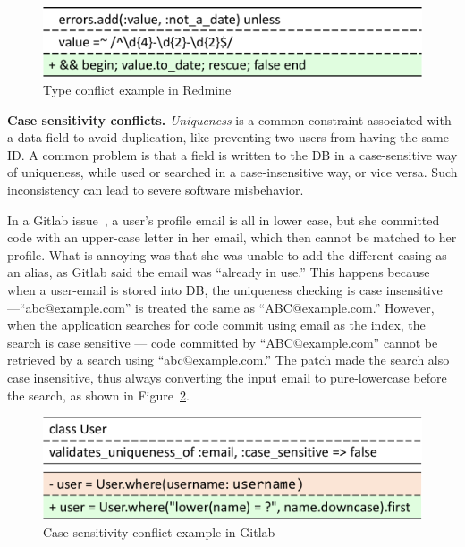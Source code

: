 \begin{figure}
    \centering
    \includegraphics[width=0.6\columnwidth]{constraints/figs/redmine-9394-tooloose.pdf}
    \vspace{-0.2in}
    \caption{Type conflict example in Redmine}
    \label{fig:redmine-9394-tooloose}
\end{figure}

\textbf{Case sensitivity conflicts.} 
{\it Uniqueness} is a common constraint associated with a data field to
avoid duplication, like preventing two users from having the same ID. 
A common problem is that a field is written to the DB in
a case-sensitive way of uniqueness, while used or searched in a
case-insensitive way, or vice versa. Such inconsistency can lead to severe software misbehavior. 

In a Gitlab issue~\cite{gitlab-24493}, a user's profile email is all in lower case, but she committed code with an upper-case letter in her email, which then cannot
be matched to her profile. What is annoying was that she was 
unable to add the different casing as an alias, as Gitlab said
the email was ``already in use.''  This happens because when a user-email is stored into DB, the uniqueness checking
is case insensitive---``abc@example.com'' is treated the same as ``ABC@example.com.'' However, when the application searches for code commit using email
as the index, the search is case sensitive --- code committed by
``ABC@example.com'' cannot be retrieved by a search using
``abc@example.com.'' The patch made the search also
case insensitive, thus always converting the input email to pure-lowercase before the
search, as shown in Figure~\ref{fig:gitlabcasesensitive}. 

\begin{figure}
    \centering
    \includegraphics[width=0.6\columnwidth]{constraints/figs/gitlab-issue.pdf}
    \caption{Case sensitivity conflict example in Gitlab}
    \label{fig:gitlabcasesensitive}
\end{figure}

